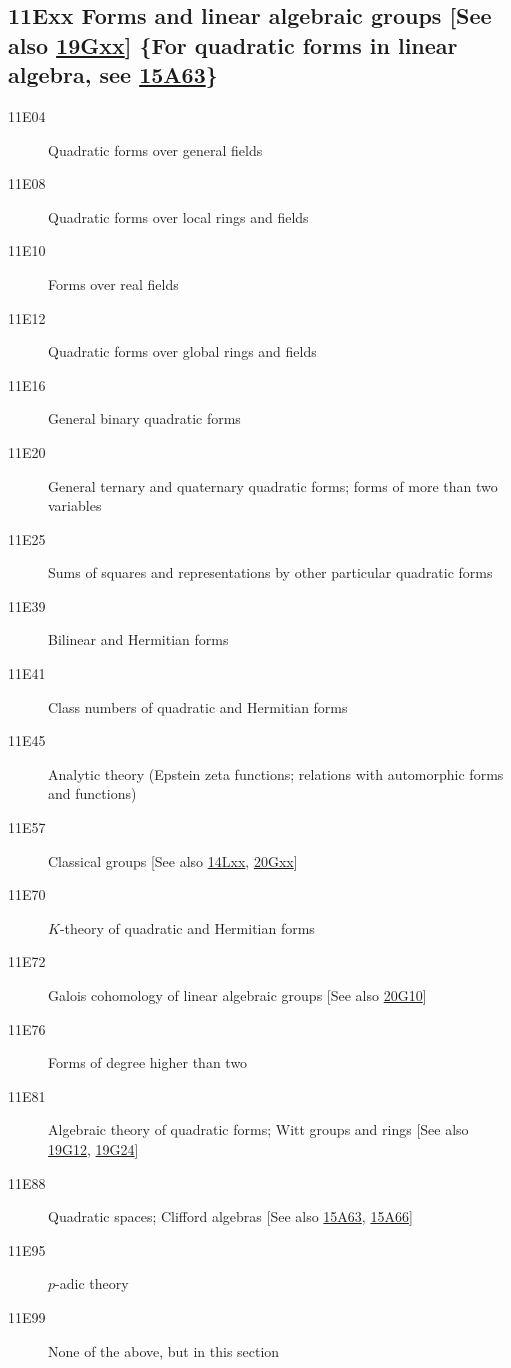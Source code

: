 \documentclass[letterpaper]{article}
\begin{document}
\subsection*{11Exx  Forms and linear algebraic groups [See also \hyperref[19Gxx]{19Gxx}] \{For quadratic forms in linear algebra, see \hyperref[15A63]{15A63}\} }\label{11Exx}
\begin{description}  
\item [11E04]\label{11E04} Quadratic forms over general fields
\item [11E08]\label{11E08} Quadratic forms over local rings and fields
\item [11E10]\label{11E10} Forms over real fields
\item [11E12]\label{11E12} Quadratic forms over global rings and fields
\item [11E16]\label{11E16} General binary quadratic forms
\item [11E20]\label{11E20} General ternary and quaternary quadratic forms; forms of more than two variables
\item [11E25]\label{11E25} Sums of squares and representations by other particular quadratic forms
\item [11E39]\label{11E39} Bilinear and Hermitian forms
\item [11E41]\label{11E41} Class numbers of quadratic and Hermitian forms
\item [11E45]\label{11E45} Analytic theory (Epstein zeta functions; relations with automorphic forms and functions)
\item [11E57]\label{11E57} Classical groups [See also \hyperref[14Lxx]{14Lxx}, \hyperref[20Gxx]{20Gxx}]
\item [11E70]\label{11E70} $K$-theory of quadratic and Hermitian forms
\item [11E72]\label{11E72} Galois cohomology of linear algebraic groups [See also \hyperref[20G10]{20G10}]
\item [11E76]\label{11E76} Forms of degree higher than two
\item [11E81]\label{11E81} Algebraic theory of quadratic forms; Witt groups and rings [See also \hyperref[19G12]{19G12}, \hyperref[19G24]{19G24}]
\item [11E88]\label{11E88} Quadratic spaces; Clifford algebras [See also \hyperref[15A63]{15A63}, \hyperref[15A66]{15A66}]
\item [11E95]\label{11E95} $p$-adic theory
\item [11E99]\label{11E99} None of the above, but in this section
\end{description}
\end{document}
